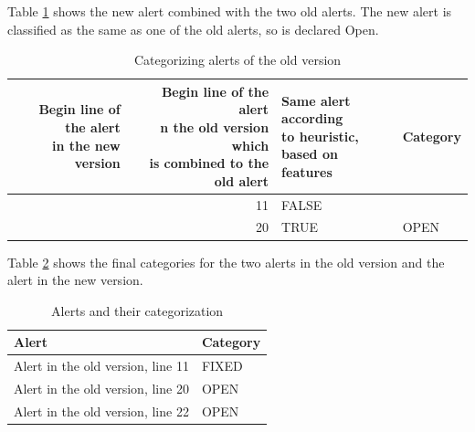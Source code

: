\documentclass[
]{article}
\begin{document}
\normalsize

Table \ref{tab_categorizing_new} shows the new alert combined with the
two old alerts. The new alert is classified as the same as one of the
old alerts, so is declared Open.

\small

\begin{table}[H]

\caption{\label{tab:unnamed-chunk-16}Categorizing alerts of the old version \label{tab_categorizing_new} }
\centering
\begin{tabular}[t]{r|r|l|l}
\hline
\makecell[l]{Begin line of the alert\\in the new version} & \makecell[l]{Begin line of the alert\\n the old version which\\is combined to the old alert} & \makecell[l]{Same alert according\\to heuristic,\\ based on features} & Category\\
\hline
\rowcolor{gray!6}   & 11 & FALSE & \\

\multirow[t]{-2}{*}{\raggedleft\arraybackslash 22} & 20 & TRUE & \multirow[t]{-2}{*}{\raggedright\arraybackslash OPEN}\\
\hline
\end{tabular}
\end{table}

\normalsize

Table \ref{tab_summary_categories} shows the final categories for the
two alerts in the old version and the alert in the new version.

\small

\begin{table}[H]

\caption{\label{tab:unnamed-chunk-17}Alerts and their categorization\label{tab_summary_categories} }
\centering
\begin{tabular}[t]{l|l}
\hline
Alert & Category\\
\hline
\rowcolor{gray!6}  Alert in the old version, line 11 & FIXED\\
\hline
Alert in the old version, line 20 & OPEN\\
\hline
\rowcolor{gray!6}  Alert in the old version, line 22 & OPEN\\
\hline
\end{tabular}
\end{table}
\end{document}
